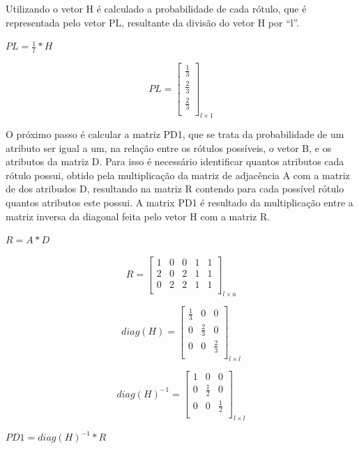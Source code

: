 Utilizando o vetor H é calculado a probabilidade de cada rótulo, que é representada
pelo vetor  PL, resultante da divisão do vetor H por ``l''.

\begin{center}
$PL= \frac{1}{l} * H$
\end{center}

$$PL=\left[
\begin{array}{c}
\frac{1}{3} \\
\frac{2}{3} \\
\frac{2}{3} \\
\end{array}
\right]_{l \times 1}$$

O próximo passo é calcular a matriz PD1, que se trata da probabilidade de um
atributo ser igual a um, na relação entre os rótulos possíveis, o vetor B, e os
atributos da matriz D. Para isso é necessário identificar quantos atributos cada
rótulo possui, obtido pela multiplicação da matriz de adjacência A com a matriz
de dos atribudos D, resultando na matriz R contendo para cada possível rótulo
quantos atributos este possui. A matrix PD1 é resultado da multiplicação entre a
matriz inversa da diagonal feita pelo vetor H com a matriz R.

\begin{center}
$R = A * D$
\end{center}

$$R=\left[
\begin{array}{ccccc}
1 & 0 & 0 & 1 & 1 \\
2 & 0 & 2 & 1 & 1 \\
0 & 2 & 2 & 1 & 1 \\
\end{array}
\right]_{l \times a}$$

$$diag(H)=\left[
\begin{array}{ccc}
\frac{1}{3} & 0 & 0 \\
0 & \frac{2}{3} & 0 \\
0 & 0 & \frac{2}{3} \\
\end{array}
\right]_{l \times l}$$

$$diag(H)^{-1}=\left[
\begin{array}{ccc}
1 & 0 & 0 \\
0 & \frac{1}{2} & 0 \\
0 & 0 & \frac{1}{2} \\
\end{array}
\right]_{l \times l}$$

\begin{center}
$PD1 = diag(H)^{-1} * R$
\end{center}

